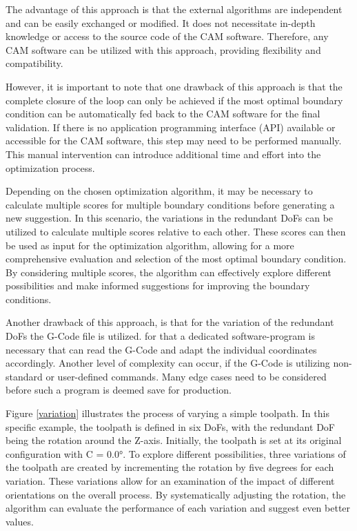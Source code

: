 The advantage of this approach is that the external algorithms are independent and can be easily exchanged or modified. It does not necessitate in-depth knowledge or access to the source code of the \acrshort{CAM} software. Therefore, any \acrshort{CAM} software can be utilized with this approach, providing flexibility and compatibility.    

However, it is important to note that one drawback of this approach is that the complete closure of the loop can only be achieved if the most optimal boundary condition can be automatically fed back to the \acrshort{CAM} software for the final validation. If there is no application programming interface (\acrshort{API}) available or accessible for the \acrshort{CAM} software, this step may need to be performed manually. This manual intervention can introduce additional time and effort into the optimization process.

Depending on the chosen optimization algorithm, it may be necessary to calculate multiple scores for multiple boundary conditions before generating a new suggestion. In this scenario, the variations in the redundant \acrshort{DoF}s can be utilized to calculate multiple scores relative to each other. These scores can then be used as input for the optimization algorithm, allowing for a more comprehensive evaluation and selection of the most optimal boundary condition. By considering multiple scores, the algorithm can effectively explore different possibilities and make informed suggestions for improving the boundary conditions.

Another drawback of this approach, is that for the variation of the redundant \acrshort{DoF}s the G-Code file is utilized. for that a dedicated software-program is necessary that can read the G-Code and adapt the individual coordinates accordingly. Another level of complexity can occur, if the G-Code is utilizing non-standard or user-defined commands. Many edge cases need to be considered before such a program is deemed save for production.       

Figure \ref{variation} illustrates the process of varying a simple toolpath. In this specific example, the toolpath is defined in six \acrshort{DoF}s, with the redundant \acrshort{DoF} being the rotation around the Z-axis. Initially, the toolpath is set at its original configuration with C = 0.0°. To explore different possibilities, three variations of the toolpath are created by incrementing the rotation by five degrees for each variation. These variations allow for an examination of the impact of different orientations on the overall process. By systematically adjusting the rotation, the algorithm can evaluate the performance of each variation and suggest even better values.


